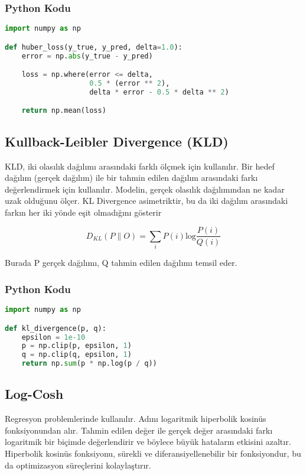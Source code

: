 \subsubsection{Python Kodu}

\begin{lstlisting}[language=Python]
import numpy as np

def huber_loss(y_true, y_pred, delta=1.0):
    error = np.abs(y_true - y_pred)

    loss = np.where(error <= delta,
                    0.5 * (error ** 2),
                    delta * error - 0.5 * delta ** 2)

    return np.mean(loss)
\end{lstlisting}

\newpage

\subsection{Kullback-Leibler Divergence (KLD)}

KLD, iki olasılık dağılımı arasındaki farklı ölçmek için kullanılır. Bir hedef dağılım (gerçek dağılım) ile bir tahmin edilen dağılım arasındaki farkı değerlendirmek için kullanılır. Modelin, gerçek olasılık dağılımından ne kadar uzak olduğunu ölçer. KL Divergence asimetriktir, bu da iki dağılım arasındaki farkın her iki yönde eşit olmadığını gösterir

\[ D_{KL}(P\|O) = \sum_{i} P(i) \text{log}\frac{P(i)}{Q(i)} \]

Burada P gerçek dağılımı, Q tahmin edilen dağılımı temsil eder. 

\subsubsection{Python Kodu}

\begin{lstlisting}[language=Python]
import numpy as np

def kl_divergence(p, q):
    epsilon = 1e-10
    p = np.clip(p, epsilon, 1)
    q = np.clip(q, epsilon, 1)
    return np.sum(p * np.log(p / q))
\end{lstlisting}

\newpage

\subsection{Log-Cosh}

Regresyon problemlerinde kullanılır. Adını logaritmik hiperbolik kosinüs fonksiyonundan alır. Tahmin edilen değer ile gerçek değer arasındaki farkı logaritmik bir biçimde değerlendirir ve böylece büyük hataların etkisini azaltır. Hiperbolik kosinüs fonksiyonu, sürekli ve diferansiyellenebilir bir fonksiyondur, bu da optimizasyon süreçlerini kolaylaştırır.

